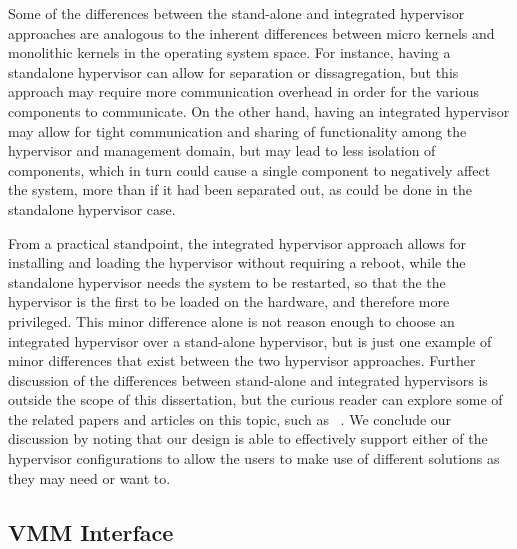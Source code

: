 Some of the differences between the stand-alone and integrated hypervisor approaches are analogous to the inherent differences between micro kernels and monolithic kernels in the operating system space. For instance, having a standalone hypervisor can allow for separation or dissagregation\cite{murray_2008}, but this approach may require more communication overhead in order for the various components to communicate. On the other hand, having an integrated hypervisor may allow for tight communication and sharing of functionality among the hypervisor and management domain, but may lead to less isolation of components, which in turn could cause a single component to negatively affect the system, more than if it had been separated out, as could be done in the standalone hypervisor case.

From a practical standpoint, the integrated hypervisor approach allows for installing and loading the hypervisor without requiring a reboot, while the standalone hypervisor needs the system to be restarted, so that the the hypervisor is the first to be loaded on the hardware, and therefore more privileged. This minor difference alone is not reason enough to choose an integrated hypervisor over a stand-alone hypervisor, but is just one example of minor differences that exist between the two hypervisor approaches. Further discussion of the differences between stand-alone and integrated hypervisors is outside the scope of this dissertation, but the curious reader can explore some of the related papers and articles on this topic, such as ~\cite{kvm_ols07, clark_2004, kvm_vs_xen_at_xen_summit_2008, redhat_rhel_54_2009, crosby_xen_dead_2008, cnet_hypervisor_2010, crosby_novell_2010, liguori_truth_2008,rhev_2009,qubes-os_2010}. We conclude our discussion by noting that our design is able to effectively support either of the hypervisor configurations to allow the users to make use of different solutions as they may need or want to.

\subsection{VMM Interface}
\label{sec:vmm-implementation}


